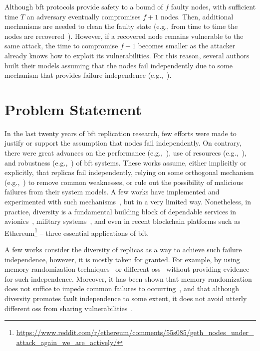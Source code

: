 Although \gls{bft} protocols provide safety to a bound of $f$ faulty nodes, with sufficient time $T$ an adversary eventually compromises $f+1$ nodes.
Then, additional mechanisms are needed to clean the faulty state (e.g., from time to time the nodes are recovered~\cite{Castro:2002}).
However, if a recovered node remains vulnerable to the same attack, the time to compromise $f+1$ becomes smaller as the attacker already knows how to exploit its vulnerabilities.
For this reason, several authors built their models assuming that the nodes fail independently due to some mechanism that provides failure independence (e.g.,~\cite{Castro:2002,Veronese:2013,Sousa:2010}).


\section{Problem Statement}
\label{sec:problemstatement}
In the last twenty years of \gls{bft} replication research, few efforts were made to justify or support the assumption that nodes fail independently. 
On contrary, there were great advances on the performance (e.g.,~\cite{Kotla:2010,Aublin:2015,Behl:2015}), use of resources (e.g.,~\cite{Yin:2003,Veronese:2013,Liu:2016,Behl:2017}), and robustness (e.g.,~\cite{Amir:2011,Bessani:2014,Clement:2009b}) of \gls{bft} systems.
These works assume, either implicitly or explicitly, that replicas fail independently, relying on some orthogonal mechanism (e.g.,~\cite{Roeder:2010,Chen:1995}) to remove common weaknesses, or rule out the possibility of malicious failures from their system models.
A few works have implemented and experimented with such mechanisms~\cite{Rodrigues:2001,Roeder:2010,Amir:2011}, but in a very limited way.
Nonetheless, in practice, diversity is a fundamental building block of dependable services in avionics~\cite{Yeh:2004}, military systems~\cite{rhimes}, and even in recent blockchain platforms such as Ethereum\footnote{\url{https://www.reddit.com/r/ethereum/comments/55s085/geth_nodes_under_attack_again_we_are_actively/}} -- three essential applications of \gls{bft}. 

A few works consider the diversity of replicas as a way to achieve such failure independence, however, it is mostly taken for granted.
For example, by using memory randomization techniques~\cite{Roeder:2010} or different \glspl{os}~\cite{Rodrigues:2001,Junqueira:2005} without providing evidence for such independence. 
Moreover, it has been shown that memory randomization does not suffice to impede common failures to occurring~\cite{Snow:2013,Bittau:2014}, and that although diversity promotes fault independence to some extent, it does not avoid utterly different \glspl{os} from sharing vulnerabilities~\cite{Garcia:2014}.

